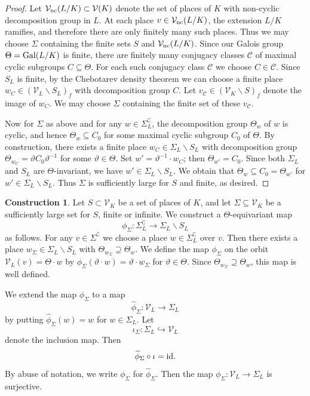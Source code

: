 \documentclass[11pt]{amsart}
\theoremstyle{plain}
\theoremstyle{definition}
\newtheorem{construction}[theorem]{Construction}
\newcommand{\into}{\hookrightarrow}
\newcommand{\wh}{\widehat}
\newcommand{\Gal}{{\rm Gal}}
\newcommand{\hs}{\kern 0.8pt}
\newcommand{\id}{{\rm id}}
\newcommand{\V}{{\mathcal V}}
\newcommand{\vt}{{\vartheta}}
\newcommand{\mC}{{\mathcal C}}
\begin{document}
\begin{proof}
Let $\V_{\rm nc}(L/K)\subset\V(K)$ denote the set of places of $K$
with non-cyclic decomposition group in $L$.
At each place $v\in\V_{\rm nc}(L/K)$, the extension $L/K$ ramifies,
and therefore there are only finitely many such places.
Thus we may choose $\Sigma$ containing the finite sets $S$ and  $\V_{\rm nc}(L/K)$.
Since our Galois group $\Theta=\Gal(L/K)$ is finite,
there are finitely many conjugacy classes $\mC$ of maximal cyclic subgroups $C\subseteq\Theta$.
For each such conjugacy class $\mC$ we choose $C\in\mC$.
Since $S_L$ is finite, by the Chebotarev density theorem
we can choose a finite place $w_{C}\in (\V_L\smallsetminus S_L)_f$ with decomposition group $C$.
Let $v_\mC \in (\V_K\smallsetminus S)_f$ denote the image of $w_C$.
We may choose $\Sigma$ containing the finite set of these $v_\mC$.


Now for $\Sigma$ as above and for any $w\in \Sigma_L^\complement$,
the decomposition group $\Theta_w$ of $w$ is cyclic,
and hence $\Theta_w\subseteq C_0$ for some maximal cyclic subgroup $C_0$ of $\Theta$.
By construction, there exists a finite place $w_C\in \Sigma_L\smallsetminus S_L$
with decomposition group $\Theta_{w_C}=\vt C_0\vt^{-1}$ for some $\vt\in\Theta$.
Set $w'= \vt^{-1}\cdot w_C$;
then $\Theta_{w'} =C_0$.
Since both $\Sigma_L$ and $S_L$ are $\Theta$-invariant, we have
$w'\in\Sigma_L\smallsetminus S_L$.
We obtain that $\Theta_w\subseteq C_0=\Theta_{w'}$ for $w'\in \Sigma_L\smallsetminus S_L$\hs.
Thus  $\Sigma$ is sufficiently large for $S$ and finite, as desired.
\end{proof}


\begin{construction}
Let $S\subset \V_K$ be a  set of places of $K$,
and let $\Sigma\subseteq\V_K$ be a sufficiently large set for $S$, finite or infinite.
We construct a $\Theta$-equivariant map
\begin{equation*}
\phi_\Sigma\colon \Sigma_L^\complement \to\Sigma_L\smallsetminus S_L
\end{equation*}
as follows.
For any $v\in \Sigma^\complement$
we choose a place $w\in \Sigma_L^\complement$ over $v$.
Then there exists a place $w_\Sigma\in \Sigma_L\smallsetminus S_L$
with $\Theta_{w_\Sigma}\supseteq \Theta_w$.
We define the map $\phi_\Sigma$ on the orbit $\V_L(v)=\Theta\cdot w$
by $\phi_\Sigma(\vartheta\cdot w)=\vartheta\cdot w_\Sigma$ for $\vartheta\in\Theta$.
Since $\Theta_{w_\Sigma}\supseteq \Theta_w$\hs,
this map is well defined.

We extend the map $\phi_\Sigma$ to a map
\begin{equation}\label{e:phi-ext}
\wh\phi_\Sigma\colon \V_L \to \Sigma_L
\end{equation}
by putting $\wh\phi_\Sigma(w)=w$ for $w\in \Sigma_L$. Let
\[\iota_\Sigma\colon \Sigma_L\into\V_L\]
denote the inclusion map.
Then
\begin{equation*}
\wh\phi_\Sigma\circ\iota=\id.
\end{equation*}
By abuse of notation, we write $\phi_\Sigma$ for $\wh\phi_\Sigma$.
Then the map $\phi_\Sigma\colon \V_L\to\Sigma_L$ is surjective.
\end{construction}
\end{document}
